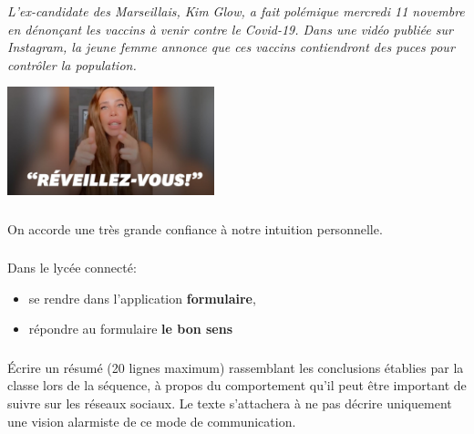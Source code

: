 \documentclass[svgnames,11pt]{beamer}
\begin{document}
\begin{frame}
    \frametitle{}

    \begin{aretenir}
    \centering \emph{L'ex-candidate des Marseillais, Kim Glow, a fait polémique mercredi 11 novembre en dénonçant les vaccins à venir contre le Covid-19. Dans une vidéo publiée sur Instagram, la jeune femme annonce que ces vaccins contiendront des puces pour contrôler la population. }
    \end{aretenir}
\begin{center}
\centering
\includegraphics[width=6cm]{ressources/kimglow.jpeg}
\end{center}
\end{frame}
\begin{frame}
    \frametitle{}

    \begin{aretenir}[Biais 4]
    \centering On accorde une très grande confiance à notre intuition personnelle.
    \end{aretenir}
\end{frame}
\begin{frame}
    \frametitle{}

    \begin{activite}
    Dans le lycée connecté:
    \begin{itemize}
        \item se rendre dans l'application \textbf{formulaire},
        \item répondre au formulaire \textbf{le bon sens}
    \end{itemize}
    \end{activite}

\end{frame}
\begin{frame}
    \frametitle{}

\begin{activite}
    Écrire un résumé (20 lignes maximum) rassemblant les conclusions établies par la classe lors de la séquence, à propos du comportement qu'il peut être important de suivre sur les réseaux sociaux. Le texte s'attachera à ne pas décrire uniquement une vision alarmiste de ce mode de communication.
    \end{activite}

\end{frame}
\end{document}
